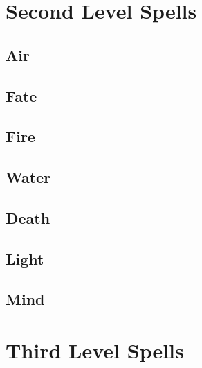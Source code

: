 \section{Second Level Spells}

\begin{multicols}{2}

\subsection{Air}


\subsection{Fate}


\subsection{Fire}


\subsection{Water}


\subsection{Death}


\subsection{Light}


\subsection{Mind}


\end{multicols}

\section{Third Level Spells}

